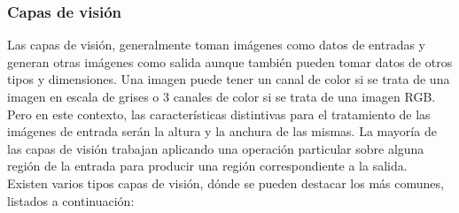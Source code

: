 \documentclass[a4paper, 12pt, oneside]{book}
\begin{document}
\subsubsection{Capas de visión}\label{CapasVision}

Las capas de visión, generalmente toman imágenes como datos de entradas y generan otras imágenes como salida aunque también pueden tomar datos de otros tipos y dimensiones. Una imagen puede tener un canal de color si se trata de una imagen en escala de grises o 3 canales de color si se trata de una imagen RGB. Pero en este contexto, las características distintivas para el tratamiento de las imágenes de entrada serán la altura y la anchura de las mismas. La mayoría de las capas de visión trabajan aplicando una operación particular sobre alguna región de la entrada para producir una región correspondiente a la salida.\\

Existen varios tipos capas de visión, dónde se pueden destacar los más comunes, listados a continuación:
\end{document}
